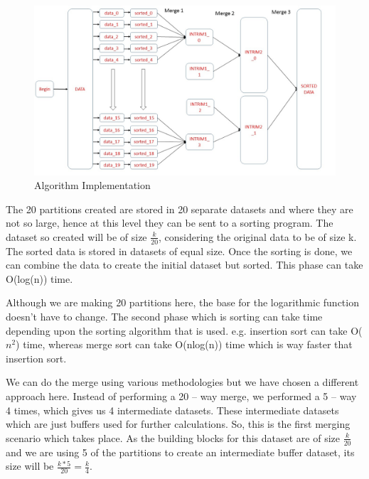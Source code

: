 \documentclass[12pt]{article}
\begin{document}
\begin{figure}[h]
	\includegraphics[width=\linewidth]{algorithm.jpg}
	\caption{Algorithm Implementation}
\end{figure}

\par
The 20 partitions created are stored in 20 separate datasets  and where they are not so large, hence at this level they can be sent to a sorting program. The dataset so created will be of size \begin{math}\frac{k}{20}\end{math}, considering the original data to be of size k. The sorted data is stored in datasets of equal size. Once the sorting is done, we can combine the data to create the initial dataset but sorted. This phase can take O(log(n)) time.

\par
Although we are making 20 partitions here, the base for the logarithmic function doesn’t have to change. The second phase which is sorting can take time depending upon the sorting algorithm that is used. e.g. insertion sort can take O(\begin{math}n^2\end{math}) time, whereas merge sort can take O(nlog(n)) time which is way faster that insertion sort.   

\par
We can do the merge using various methodologies but we have chosen a different approach here. Instead of performing a 20 – way merge, we performed a 5 – way 4 times, which gives us 4 intermediate datasets. These intermediate datasets which are just buffers used for further calculations. So, this is the first merging scenario which takes place. As the building blocks for this dataset are of size \begin{math}\frac{k}{20}\end{math} and we are using 5 of the partitions to create an intermediate buffer dataset, its size will be \begin{math}\frac{k*5}{20} =  \frac{k}{4}\end{math}.
\end{document}
